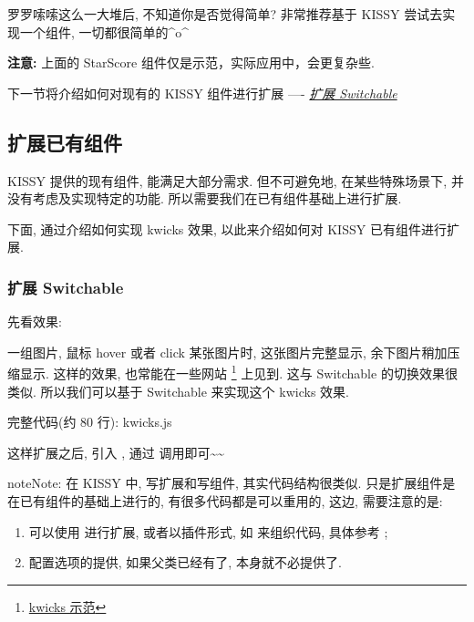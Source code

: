\documentclass[letterpaper,10pt,english]{sphinxmanual}
\begin{document}
罗罗嗦嗦这么一大堆后, 不知道你是否觉得简单? 非常推荐基于 KISSY 尝试去实现一个组件, 一切都很简单的\textasciicircum{}o\textasciicircum{}

\textbf{注意:} 上面的 StarScore 组件仅是示范，实际应用中，会更复杂些.

下一节将介绍如何对现有的 KISSY 组件进行扩展 ---- {\hyperref[quickstart/extendwidgets:extendwidgets]{\emph{扩展 Switchable}}}


\subsection{扩展已有组件}
\label{quickstart/extendwidgets:extendwidgets}\label{quickstart/extendwidgets::doc}\label{quickstart/extendwidgets:id1}
KISSY 提供的现有组件, 能满足大部分需求. 但不可避免地, 在某些特殊场景下, 并没有考虑及实现特定的功能. 所以需要我们在已有组件基础上进行扩展.

下面, 通过介绍如何实现 kwicks 效果, 以此来介绍如何对 KISSY 已有组件进行扩展.


\subsubsection{扩展 Switchable}
\label{quickstart/extendwidgets:switchable}
先看效果:

一组图片, 鼠标 hover 或者 click 某张图片时, 这张图片完整显示, 余下图片稍加压缩显示. 这样的效果, 也常能在一些网站 \footnote{
\href{http://eyedraw.eu/}{kwicks 示范}
} 上见到. 这与 Switchable 的切换效果很类似. 所以我们可以基于 Switchable 来实现这个 kwicks 效果.

完整代码(约 80 行): kwicks.js

这样扩展之后, 引入  , 通过  调用即可\textasciitilde{}\textasciitilde{}

\begin{notice}{note}{Note:}
在 KISSY 中, 写扩展和写组件, 其实代码结构很类似. 只是扩展组件是在已有组件的基础上进行的, 有很多代码都是可以重用的, 这边, 需要注意的是:
\begin{enumerate}
\item {}
可以使用  进行扩展, 或者以插件形式, 如  来组织代码, 具体参考 ;

\item {}
配置选项的提供, 如果父类已经有了, 本身就不必提供了.

\end{enumerate}
\end{notice}
\end{document}
